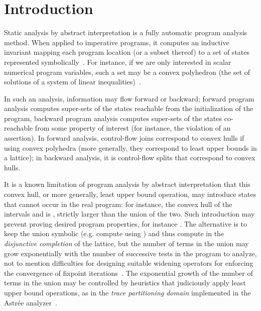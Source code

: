 \section{Introduction}
Static analysis by abstract interpretation is a fully automatic program analysis method. When applied to imperative programs, it computes an inductive invariant mapping each program location (or a subset thereof) to a set of states represented symbolically~\cite{CousotCousot_JLC92}.
For instance, if we are only interested in scalar numerical program variables, such a set may be a convex polyhedron (the set of solutions of a system of linear inequalities)~\cite{CousotHalbwachs78,Halbwachs_PhD,PPL,BagnaraHZ08SCP}.

In such an analysis, information may flow forward  or backward;
forward program analysis computes super-sets of the states reachable from the initialization of the program, backward program analysis computes super-sets of the states co-reachable from some property of interest (for instance, the violation of an assertion).
In forward analysis, control-flow joins correspond to convex hulls if using convex polyhedra (more generally, they correspond to least upper bounds in a lattice); in backward analysis, it is control-flow splits that correspond to convex hulls.

It is a known limitation of program analysis by abstract interpretation that this convex hull, or more generally, least upper bound operation, may introduce states that cannot occur in the real program: for instance, the convex hull of the intervals  and  is , strictly larger than the union of the two.
Such introduction may prevent proving desired program properties, for instance . The alternative is to keep the union symbolic (e.g. compute using ) and thus compute in the \emph{disjunctive completion}
of the lattice, but the number of terms in the union may grow exponentially with the number of successive tests in the program to analyze, not to mention difficulties for designing suitable widening operators for enforcing the convergence of fixpoint iterations~\cite{PPL,BagnaraHZ08SCP,DBLP:journals/sttt/BagnaraHZ07}.
The exponential growth of the number of terms in the union may be controlled by heuristics that judiciously apply least upper bound operations, as in the \emph{trace partitioning domain} \cite{Rival_Mauborgne_TOPLAS07} implemented in the Astr\'ee analyzer~\cite{ASTREE_PLDI03,ASTREE_ESOP05}.

